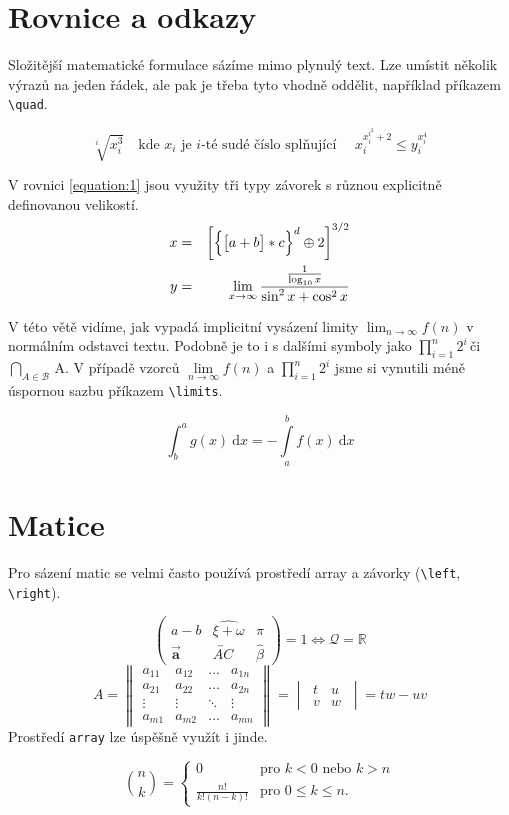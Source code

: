 \documentclass[a4paper,twocolumn,11pt]{article}
\theoremstyle{definition}
\theoremstyle{plain}
\begin{document}
\section{Rovnice a odkazy}
    Složitější matematické formulace sázíme mimo plynulý
    text. Lze umístit několik výrazů na jeden řádek, ale pak je
    třeba tyto vhodně oddělit, například příkazem \verb|\quad|. 
    
    
    $$\sqrt[i]{x_{i}^{3}}\quad\mbox{kde } x_i \mbox{ je } i 
    \mbox{-té sudé číslo splňující }\quad x_{i}^{x_{i}^{i^{2}}+2} \leq y_{i}^{x_{i}^{4}}$$
   
    
    V rovnici \eqref{equation:1} jsou využity tři typy závorek s různou
    explicitně definovanou velikostí.
    \begin{eqnarray}
        x & = & \left[\Bigl\{\big[a+b\big]*c\Bigr\}^{d}
        \oplus2\right]^{3/2}\label{equation:1}\\
        y & = & \lim _{x \rightarrow \infty} 
        \frac{\frac{1}{\log _{10} x}}{\sin ^{2} x+\cos ^{2} x}\nonumber
   \end{eqnarray}
    
    
    V této větě vidíme, jak vypadá implicitní vysázení limity 
    $\lim _{n\rightarrow \infty} f(n)$ v normálním odstavci textu. Podobně je to i s dalšími symboly jako $\prod _{i=1}^n 2^i$\,či $\bigcap _{A\in \mathcal{B}}$\,A. V pří\-padě vzorců 
    $\lim\limits _{n\rightarrow \infty} f(n)$ a 
    $\prod\limits _{i=1}^n 2^i$ jsme si vynutili méně úspornou sazbu příkazem \verb|\limits|.
    
    \begin{equation}
        \int_{b}^{a} g(x)~\mathrm{d}x = -\int\limits _{a}^{b}f(x)~\mathrm{d} x
    \end{equation}
\section{Matice}
    Pro sázení matic se velmi často používá prostředí array
    a závorky (\verb|\left|, \verb|\right|).

    $$
        \left(\begin{array}{ccc}
        a-b & \widehat{\xi + \omega} & \pi\\
        \vec{\mathbf{a}} & \overleftrightarrow{AC} & \hat{\beta}
        \end{array}\right)
        = 1 \Longleftrightarrow \mathcal{Q} = \mathbb{R}
    $$
    $$
        A =
        \begin{Vmatrix}
            a_{11}& a_{12} &\ldots & a_{1n}\\
            a_{21}& a_{22} &\ldots & a_{2n}\\
            \vdots& \vdots &\ddots & \vdots\\
            a_{m1}& a_{m2} &\ldots & a_{mn}
        \end{Vmatrix}
        =
        \begin{vmatrix}
             ~t & u~\\
             ~v & w~
        \end{vmatrix}
        = tw\!-\!uv
        $$
    Prostředí \texttt{array} lze úspěšně využít i jinde.
    
    $$
        \binom{n}{k} = 
        \left\{
            \begin{array}{cl}
                0 & \text{pro } k < 0 \text{ nebo } k > n\\
                \frac{n!}{k!(n-k)!} & \text{pro } 0\leq k \leq n.
             \end{array}
        \right.
    $$
\end{document}
